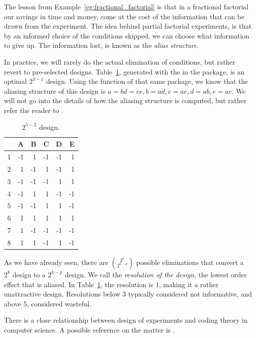 The lesson from Example~\ref{eg:fractional_factorial} is that in a fractional factorial our savings in time and money, come at the cost of the information that can be drawn from the experiment.
The idea behind partial factorial experiments, is that by an informed choice of the conditions skipped, we can choose what information to give up. The information lost, is known as the \emph{alias structure}.

In practice, we will rarely do the actual elimination of conditions, but rather revert to pre-selected designs. 
Table~\ref{tab:partial_factorial_ii}, generated with the  in the  \R package, is an optimal $2^{3-1}$ design.
Using the  function of that same package, we know that the aliasing structure of this design is
$a=bd=ce, b=ad, c=ae, d=ab, e=ac$.
We will not go into the details of how the aliasing structure is computed, but rather refer the reader to \cite{cox_theory_2000}.
\begin{table}[ht]
\centering
\begin{tabular}{rrrrrr}
  \hline
 & A & B & C & D & E \\ 
  \hline
1 & -1 & 1 & -1 & -1 & 1 \\ 
  2 & 1 & -1 & 1 & -1 & 1 \\ 
  3 & -1 & -1 & -1 & 1 & 1 \\ 
  4 & -1 & 1 & 1 & -1 & -1 \\ 
  5 & -1 & -1 & 1 & 1 & -1 \\ 
  6 & 1 & 1 & 1 & 1 & 1 \\ 
  7 & 1 & -1 & -1 & -1 & -1 \\ 
  8 & 1 & 1 & -1 & 1 & -1 \\ 
   \hline
\end{tabular}
\label{tab:partial_factorial_ii}
\caption{$2^{5-2}$ design.}
\end{table}


\begin{definition}
As we have already seen, there are $\binom{2^k}{2^{k-p}}$ possible eliminations that convert a $2^k$ design to a $2^{k-p}$ design.
We call the \emph{resolution of the design}, the lowest order effect that is aliased. 
In Table~\ref{tab:partial_factorial_ii}, the resolution is 1, making it a rather unattractive design. 
Resolutions below 3 typically considered not informative, and above 5, considered wasteful.
\end{definition}


\begin{extra}
There is a close relationship between design of experiments and coding theory in computer science. 
A possible reference on the matter is \cite{hill_first_1986}.
\end{extra}







